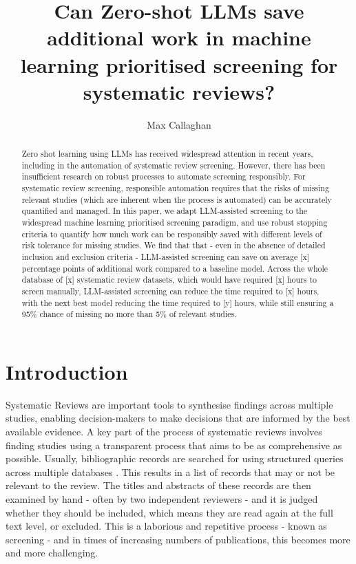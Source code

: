 \documentclass{article}
\title{Can Zero-shot LLMs save additional work in machine learning prioritised screening for systematic reviews?}
\author[1,2]{Max Callaghan}
\affil[1]{Mercator Research Institute on Global Commons and Climate Change, Torgauer Straße 12-15, 10829 Berlin, Germany}
\affil[2]{%
	Potsdam Institute for Climate Impact Research (PIK), Member of the Leibniz Association, P.O. Box 60 12 03, 14412 Potsdam, Germany
}
\begin{document}
	\maketitle
	
	\doublespacing
	
	\begin{abstract}
		Zero shot learning using LLMs has received widespread attention in recent years, including in the automation of systematic review screening. 
		However, there has been insufficient research on robust processes to automate screening responsibly. 
		For systematic review screening, responsible automation requires that the risks of missing relevant studies (which are inherent when the process is automated) can be accurately quantified and managed.
		In this paper, we adapt LLM-assisted screening to the widespread machine learning prioritised screening paradigm, and use robust stopping criteria to quantify how much work can be responsibly saved with different levels of risk tolerance for missing studies.
		We find that that - even in the absence of detailed inclusion and exclusion criteria - LLM-assisted screening can save on average [x] percentage points of additional work compared to a baseline model.
		Across the whole database of [x] systematic review datasets, which would have required [x] hours to screen manually, LLM-assisted screening can reduce the time required to [x] hours, with the next best model reducing the time required to [y] hours, while still ensuring a 95\% chance of missing no more than 5\% of relevant studies.
	\end{abstract}

	\section*{Introduction}
	
	Systematic Reviews are important tools to synthesise findings across multiple studies, enabling decision-makers to make decisions that are informed by the best available evidence. 
	A key part of the process of systematic reviews involves finding studies using a transparent process that aims to be as comprehensive as possible. 
	Usually, bibliographic records are searched for using structured queries across multiple databases \cite{lefebvre_chapter_2023}.
	This results in a list of records that may or not be relevant to the review. The titles and abstracts of these records are then examined by hand - often by two independent reviewers - and it is judged whether they should be included, which means they are read again at the full text level, or excluded.
	This is a laborious and repetitive process - known as screening - and in times of increasing numbers of publications, this becomes more and more challenging. 
	
\end{document}
